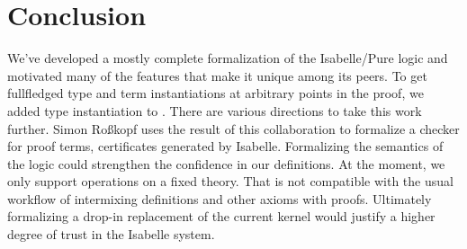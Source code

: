 \chapter{Conclusion}\label{chapter:conclusion}

We've developed a mostly complete formalization of the Isabelle/Pure logic and motivated many of the features that make it unique among its peers.
To get fullfledged type and term instantiations at arbitrary points in the proof, we added type instantiation to \ax.
There are various directions to take this work further.
Simon Roßkopf uses the result of this collaboration to formalize a checker for proof terms, certificates generated by Isabelle.
Formalizing the semantics of the logic could strengthen the confidence in our definitions.
At the moment, we only support operations on a fixed theory.
That is not compatible with the usual workflow of intermixing definitions and other axioms with proofs.
Ultimately formalizing a drop-in replacement of the current kernel would justify a higher degree of trust in the Isabelle system.